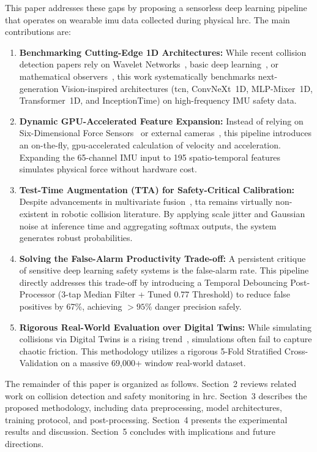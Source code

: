 \documentclass[3p,times,procedia]{elsarticle}
\begin{document}
This paper addresses these gaps by proposing a sensorless deep learning pipeline that operates on wearable \ac{imu} data collected during physical \ac{hrc}. The main contributions are:

\begin{enumerate}
    \item \textbf{Benchmarking Cutting-Edge 1D Architectures:} While recent collision detection papers rely on Wavelet Networks~\cite{niu2024wavelet}, basic deep learning~\cite{zhao2025zeroforce}, or mathematical observers~\cite{tonti2024eso}, this work systematically benchmarks next-generation Vision-inspired architectures (\ac{tcn}, ConvNeXt~1D, MLP-Mixer~1D, Transformer~1D, and InceptionTime) on high-frequency IMU safety data.
    \item \textbf{Dynamic GPU-Accelerated Feature Expansion:} Instead of relying on Six-Dimensional Force Sensors~\cite{wang2025sixdof} or external cameras~\cite{hoang2024grasp}, this pipeline introduces an on-the-fly, \ac{gpu}-accelerated calculation of velocity and acceleration. Expanding the 65-channel IMU input to 195 spatio-temporal features simulates physical force without hardware cost.
    \item \textbf{Test-Time Augmentation (TTA) for Safety-Critical Calibration:} Despite advancements in multivariate fusion~\cite{fang2024multivariate}, \ac{tta} remains virtually non-existent in robotic collision literature. By applying scale jitter and Gaussian noise at inference time and aggregating softmax outputs, the system generates robust probabilities.
    \item \textbf{Solving the False-Alarm Productivity Trade-off:} A persistent critique of sensitive deep learning safety systems is the false-alarm rate. This pipeline directly addresses this trade-off by introducing a Temporal Debouncing Post-Processor (3-tap Median Filter + Tuned 0.77 Threshold) to reduce false positives by 67\%, achieving $>95\%$ danger precision safely.
    \item \textbf{Rigorous Real-World Evaluation over Digital Twins:} While simulating collisions via Digital Twins is a rising trend~\cite{an2024digitaltwin}, simulations often fail to capture chaotic friction. This methodology utilizes a rigorous 5-Fold Stratified Cross-Validation on a massive 69,000+ window real-world dataset.
\end{enumerate}

The remainder of this paper is organized as follows. Section~2 reviews related work on collision detection and safety monitoring in \ac{hrc}. Section~3 describes the proposed methodology, including data preprocessing, model architectures, training protocol, and post-processing. Section~4 presents the experimental results and discussion. Section~5 concludes with implications and future directions.
\end{document}
